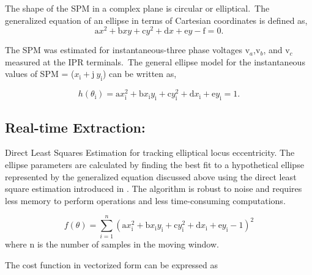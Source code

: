 The shape of the SPM in a complex plane is circular or elliptical.~The generalized equation of an ellipse in terms of Cartesian coordinates is defined as,
\begin{equation}
	\text{a}x^{2} + \text{b}xy + \text{c}y^{2} + \text{d}x + \text{e}y - \text{f} = 0.
\end{equation}

The SPM was estimated for instantaneous-three phase voltages  $\text{v}_{a}$,$\text{v}_{b}$, and $\text{v}_{c}$ measured at the IPR terminals.~The general ellipse model for the instantaneous values of SPM = ($x_\text{i} + \text{j}~ y_\text{i}$) can be written as,


\begin{equation}
	h(\theta_\text{i})=\text{a}x_{\text{i}}^{2} + \text{b}x_\text{i}y_\text{i} + \text{c}y_{\text{i}}^{2} + \text{d}x_{\text{i}} + \text{e}y_{\text{i}} = 1.
\end{equation}

\subsection{Real-time Extraction:} 

Direct Least Squares Estimation for tracking elliptical locus eccentricity. The ellipse parameters are calculated by finding the best fit to a hypothetical ellipse represented by the generalized equation discussed above using the direct least square estimation introduced in 
\cite{Fitzgibbon}. The algorithm is robust to noise and requires less memory to perform operations and less time-consuming computations.



\begin{equation}
	f(\theta)=\sum_{i=1}^{n} {(\text{a}x_{\text{i}}^{2} + \text{b}x_\text{i}y_\text{i} + \text{c}y_{\text{i}}^{2} + \text{d}x_{\text{i}} + \text{e}y_{\text{i}} - 1)^2} 
\end{equation}
where n is the number of samples in the moving window.

The cost function in vectorized form can be expressed as

